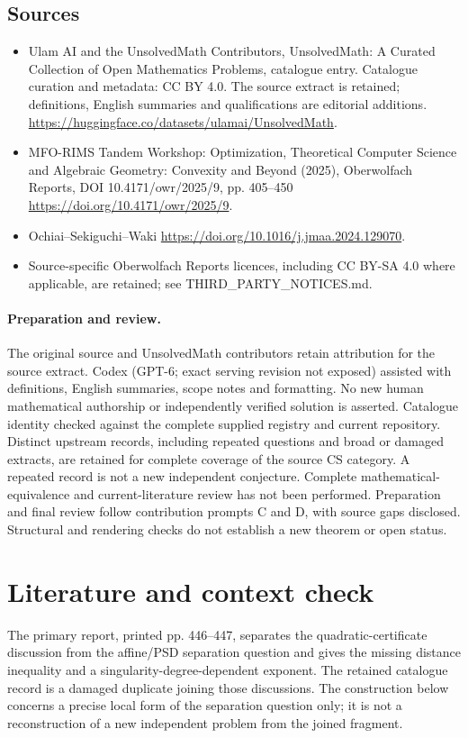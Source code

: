 \documentclass[11pt]{article}
\begin{document}
\subsection{Sources}
\begin{itemize}
\item[S1] Ulam AI and the UnsolvedMath Contributors, UnsolvedMath: A Curated Collection of Open Mathematics Problems, catalogue entry. Catalogue curation and metadata: CC BY 4.0. The source extract is retained; definitions, English summaries and qualifications are editorial additions.
\url{https://huggingface.co/datasets/ulamai/UnsolvedMath}.
\item[S2] MFO-RIMS Tandem Workshop: Optimization, Theoretical Computer Science and Algebraic Geometry: Convexity and Beyond (2025), Oberwolfach Reports, DOI 10.4171/owr/2025/9, pp. 405--450
\url{https://doi.org/10.4171/owr/2025/9}.
\item[S3] Ochiai--Sekiguchi--Waki
\url{https://doi.org/10.1016/j.jmaa.2024.129070}.
\item Source-specific Oberwolfach Reports licences, including CC BY-SA 4.0 where applicable, are retained; see THIRD\_PARTY\_NOTICES.md.
\end{itemize}
\paragraph{Preparation and review.}
The original source and UnsolvedMath contributors retain attribution for the source extract. Codex (GPT-6; exact serving revision not exposed) assisted with definitions, English summaries, scope notes and formatting. No new human mathematical authorship or independently verified solution is asserted. Catalogue identity checked against the complete supplied registry and current repository. Distinct upstream records, including repeated questions and broad or damaged extracts, are retained for complete coverage of the source CS category. A repeated record is not a new independent conjecture. Complete mathematical-equivalence and current-literature review has not been performed. Preparation and final review follow contribution prompts C and D, with source gaps disclosed. Structural and rendering checks do not establish a new theorem or open status.
\label{end:statement}

\section{Literature and context check}
The primary report, printed pp. 446--447, separates the quadratic-certificate discussion from the affine/PSD separation question and gives the missing distance inequality and a singularity-degree-dependent exponent. The retained catalogue record is a damaged duplicate joining those discussions. The construction below concerns a precise local form of the separation question only; it is not a reconstruction of a new independent problem from the joined fragment.
\end{document}

